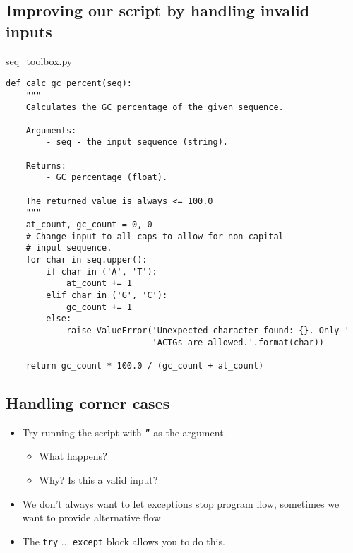 \documentclass[aspectratio=1610,slidestop]{beamer}
\begin{document}
\subsection{Improving our script by handling invalid inputs}
\begin{pframe}
 \begin{pythonfile}{seq\_toolbox.py}
  \begin{tiny}
  \begin{verbatim}
def calc_gc_percent(seq):
    """
    Calculates the GC percentage of the given sequence.

    Arguments:
        - seq - the input sequence (string).

    Returns:
        - GC percentage (float).

    The returned value is always <= 100.0
    """
    at_count, gc_count = 0, 0
    # Change input to all caps to allow for non-capital
    # input sequence.
    for char in seq.upper():
        if char in ('A', 'T'):
            at_count += 1
        elif char in ('G', 'C'):
            gc_count += 1
        else:
            raise ValueError('Unexpected character found: {}. Only '
                             'ACTGs are allowed.'.format(char))

    return gc_count * 100.0 / (gc_count + at_count)
    \end{verbatim}
  \end{tiny}
 \end{pythonfile}
\end{pframe}


\subsection{Handling corner cases}
\begin{pframe}
 \begin{itemize}
  \item Try running the script with \texttt{''} as the argument.
  \begin{itemize}
   \item What happens?
   \item Why? Is this a valid input?
  \end{itemize}
  \item We don't always want to let exceptions stop program flow,
  sometimes we want to provide alternative flow.
  \item The \texttt{try} ... \texttt{except} block
allows you to do this.
 \end{itemize}
\end{pframe}
\end{document}
